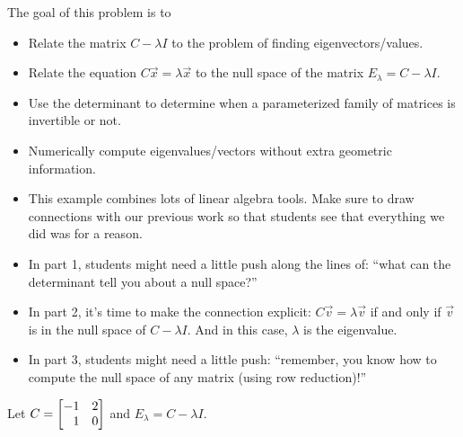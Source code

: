 	\bookonlynewpage
	\question
	\begin{annotation}
		\begin{goals}

			The goal of this problem is to
			\begin{itemize}
				\item Relate the matrix $C-\lambda I$ to the problem of finding eigenvectors/values.
				\item Relate the equation $C\vec x=\lambda \vec x$ to the null
					space of the matrix $E_{\lambda} = C-\lambda I$.
				\item Use the determinant to determine when a parameterized family of matrices
					is invertible or not.
				\item Numerically compute eigenvalues/vectors without extra geometric information.
			\end{itemize}
		\end{goals}

		\begin{notes}
			\begin{itemize}
				\item This example combines lots of linear algebra tools. Make sure to draw
					connections with our previous work so that students see that
					everything we did was for a reason.
				\item In part 1, students might need a little push along the lines of:
					``what can the determinant tell you about a null space?''
				\item In part 2, it's time to make the connection explicit: $C\vec v=\lambda \vec v$
					if and only if $\vec v$ is in the null space of $C-\lambda I$. And in this case,
					$\lambda$ is the eigenvalue.
				\item In part 3, students might need a little push: ``remember, you know how
					to compute the null space of any matrix (using row reduction)!''
			\end{itemize}
		\end{notes}
	\end{annotation}
	Let $C=\mat{-1&2\\1&0}$ and $E_\lambda = C-\lambda I$.
